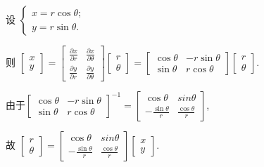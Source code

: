 \documentclass{homework}
\begin{document}

设 \(\begin{cases}x=r\cos\theta;\\y=r\sin\theta.\end{cases}\)

则 \(\begin{bmatrix}
  x\\
  y
\end{bmatrix}=\begin{bmatrix}
  \frac{\partial x}{\partial r} & \frac{\partial x}{\partial\theta}\\
  \frac{\partial y}{\partial r} & \frac{\partial y}{\partial\theta}
\end{bmatrix}\begin{bmatrix}
  r\\
  \theta
\end{bmatrix}=\begin{bmatrix}
  \cos\theta & -r\sin\theta\\
  \sin\theta & r\cos\theta
\end{bmatrix}\begin{bmatrix}
  r\\
  \theta
\end{bmatrix}\).

由于\(\begin{bmatrix}
  \cos\theta & -r\sin\theta\\
  \sin\theta & r\cos\theta
\end{bmatrix}^{-1}=\begin{bmatrix}
  \cos\theta & sin\theta\\
  -\frac{\sin\theta}{r} & \frac{\cos\theta}{r}
\end{bmatrix}\),

故 \(\begin{bmatrix}
  r\\
  \theta
\end{bmatrix}=\begin{bmatrix}
  \cos\theta & sin\theta\\
  -\frac{\sin\theta}{r} & \frac{\cos\theta}{r}
\end{bmatrix}\begin{bmatrix}
  x\\
  y
\end{bmatrix}\).
\end{document}
